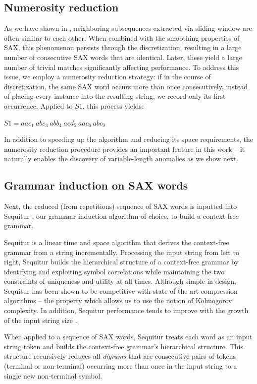 \documentclass{sig-alternate}
\begin{document}
\subsection{Numerosity reduction} As we have shown in \cite{lin_motifs}, neighboring subsequences extracted via sliding window are often similar to each other. When combined with the smoothing properties of SAX, this phenomenon persists through the discretization, resulting in a large number of consecutive SAX words that are identical. Later, these yield a large number of trivial matches significantly affecting performance. To address this issue, we employ a numerosity reduction strategy: if in the course of discretization, the same SAX word occurs more than once consecutively, instead of placing every instance into the resulting string, we record only its first occurrence. Applied to $S1$, this process yields:
\begin{center}
 $S1 = \textit{aac}_{1}~ \textit{abc}_{3}~ \textit{abb}_{4}~ \textit{acd}_{5}~ \textit{aac}_{6}~ \textit{abc}_{9}$ 
\end{center}
In addition to speeding up the algorithm and reducing its space requirements, the numerosity reduction procedure provides an important feature in this work -- it naturally enables the discovery of variable-length anomalies as we show next. 

\subsection{Grammar induction on SAX words}\label{rule_utility}
Next, the reduced (from repetitions) sequence of SAX words is inputted into Sequitur \cite{sequitur}, our grammar induction algorithm of choice, to build a context-free grammar. 

Sequitur is a linear time and space algorithm that derives the context-free grammar from a string incrementally. Processing the input string from left to right, Sequitur builds the hierarchical structure of a context-free grammar by identifying and exploiting symbol correlations while maintaining the two constraints of uniqueness and utility at all times. Although simple in design, Sequitur has been shown to be competitive with state of the art compression algorithms -- the property which allows us to use the notion of Kolmogorov complexity. In addition, Sequitur performance tends to improve with the growth of the input string size \cite{compression}. 

When applied to a sequence of SAX words, Sequitur treats each word as an input string token and builds the context-free grammar's hierarchical structure. This structure recursively reduces all \textit{digrams} that are consecutive pairs of tokens (terminal or non-terminal) occurring more than once in the input string to a single new non-terminal symbol. 
\end{document}
